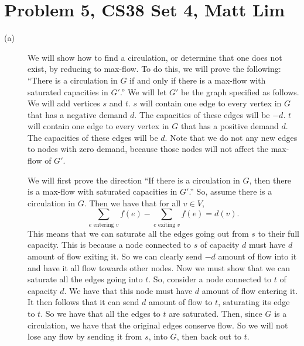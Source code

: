 \documentclass{article}
\begin{document}
\section*{Problem 5, CS38 Set 4, Matt Lim}
\begin{description}
    \item[(a)] We will show how to find a circulation, or determine that one
        does not exist, by reducing to max-flow. To do this, we will prove the
        following: ``There is a circulation in $G$ if and only if there is a
        max-flow with saturated capacities in $G'$.'' We will let $G'$ be the
        graph specified as follows. We will add vertices $s$ and $t$. $s$ will
        contain one edge to every vertex in $G$ that has a negative demand $d$.
        The capacities of these edges will be $-d$. $t$ will contain one edge to
        every vertex in $G$ that has a positive demand $d$. The capacities of
        these edges will be $d$. Note that we do not any new edges to nodes with
        zero demand, because those nodes will not affect the max-flow of $G'$.

        We will first prove the direction ``If there is a circulation in $G$,
        then there is a max-flow with saturated capacities in $G'$.'' So, assume
        there is a circulation in $G$. Then we have that for all $v \in V$,
        \[\sum_{e \mbox{ entering } v}f(e) - \sum_{e \mbox{ exiting } v}f(e) = d(v).\]
        This means that we can saturate all the edges going out from $s$ to
        their full capacity. This is because a node connected to $s$ of capacity $d$
        must have $d$ amount of flow exiting it. So we can clearly send $-d$
        amount of flow into it and have it all flow towards other nodes. Now we
        must show that we can saturate all the edges going into $t$. So,
        consider a node connected to $t$ of capacity $d$. We have that this node
        must have $d$ amount of flow entering it. It then follows that it can
        send $d$ amount of flow to $t$, saturating its edge to $t$. So we have
        that all the edges to $t$ are saturated. Then, since $G$ is a
        circulation, we have that the original edges conserve flow. So we will
        not lose any flow by sending it from $s$, into $G$, then back out to
        $t$.


\end{description}
\end{document}

